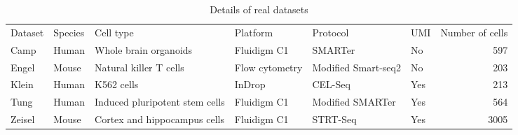 \begin{table}
\caption{\label{tab:datasets}Details of real datasets}
\begin{tabular}[t]{l l l l l l r}
Dataset & Species & Cell type & Platform & Protocol & UMI & Number of cells\\
Camp & Human & Whole brain organoids & Fluidigm C1 & SMARTer & No & 597\\
Engel & Mouse & Natural killer T cells & Flow cytometry & Modified Smart-seq2 & No & 203\\
Klein & Human & K562 cells & InDrop & CEL-Seq & Yes & 213\\
Tung & Human & Induced pluripotent stem cells & Fluidigm C1 & Modified SMARTer & Yes & 564\\
Zeisel & Mouse & Cortex and hippocampus cells & Fluidigm C1 & STRT-Seq & Yes & 3005\\
\end{tabular}
\end{table}